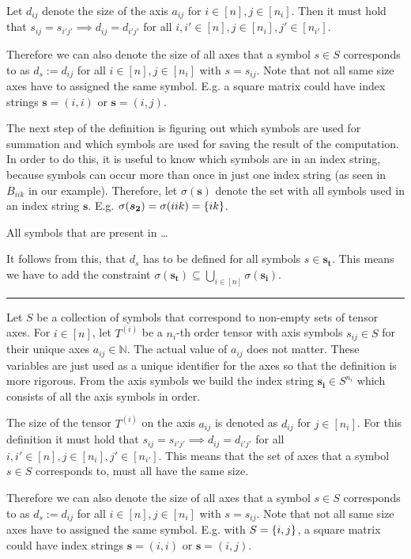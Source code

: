\begin{definition}
    Let $d_{ij}$ denote the size of the axis $a_{ij}$ for $i \in [n], j \in [n_i]$.
    Then it must hold that $s_{ij} = s_{i'j'} \implies d_{ij} = d_{i'j'}$ for all $i,i' \in [n], j \in [n_i], j' \in [n_{i'}]$.

    Therefore we can also denote the size of all axes that a symbol $s \in S$ corresponds to as $d_s := d_{ij}$ for all $i \in [n], j \in [n_i]$ with $s = s_{ij}$.
    Note that not all same size axes have to assigned the same symbol. E.g. a square matrix could have index strings $\bm{s} = (i, i)$ or $\bm{s} = (i, j)$.

    The next step of the definition is figuring out which symbols are used for summation and which symbols are used for saving the result of the computation.
    In order to do this, it is useful to know which symbols are in an index string, because symbols can occur more than once in just one index string (as seen in $B_{iik}$ in our example).
    Therefore, let $\sigma(\bm{s})$ denote the set with all symbols used in an index string $\bm{s}$.
    E.g. $\sigma(\bm{s_2}) = \sigma(iik) = \lbrace ik \rbrace$.

    All symbols that are present in \dots

    It follows from this, that $d_s$ has to be defined for all symbols $s \in \bm{s_t}$.
    This means we have to add the constraint $\sigma(\bm{s_t}) \subseteq \bigcup_{i \in [n]} \sigma(\bm{s_i})$.

    \hrule

    Let $S$ be a collection of symbols that correspond to non-empty sets of tensor axes.
    For $i \in [n]$, let $T^{(i)}$ be a $n_i$-th order tensor with axis symbols $s_{ij} \in S$ for their unique axes $a_{ij} \in \mathbb{N}$.
    The actual value of $a_{ij}$ does not matter. These variables are just used as a unique identifier for the axes so that the definition is more rigorous.
    From the axis symbols we build the index string $\bm{s_i} \in S^{n_i}$ which consists of all the axis symbols in order.

    The size of the tensor $T^{(i)}$ on the axis $a_{ij}$ is denoted as $d_{ij}$ for $j \in [n_i]$.
    For this definition it must hold that $s_{ij} = s_{i'j'} \implies d_{ij} = d_{i'j'}$ for all $i,i' \in [n], j \in [n_i], j' \in [n_{i'}]$.
    This means that the set of axes that a symbol $s \in S$ corresponds to, must all have the same size.

    Therefore we can also denote the size of all axes that a symbol $s \in S$ corresponds to as $d_s := d_{ij}$ for all $i \in [n], j \in [n_i]$ with $s = s_{ij}$.
    Note that not all same size axes have to assigned the same symbol. E.g. with $S = \left\lbrace i,j \right\rbrace$, a square matrix could have index strings $\bm{s} = (i, i)$ or $\bm{s} = (i, j)$.


\end{definition}
